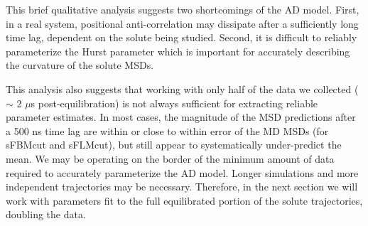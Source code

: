 \documentclass[12pt]{article}
\begin{document}
  This brief qualitative analysis suggests two shortcomings of the AD model. First, in
  a real system, positional anti-correlation may dissipate after a sufficiently long 
  time lag, dependent on the solute being studied. Second, it is difficult to reliably
  parameterize the Hurst parameter which is important for accurately describing the 
  curvature of the solute MSDs.
  
  This analysis also suggests that working with only half of the data we collected
  ($\sim$ 2 $\mu$s post-equilibration) is not always sufficient for extracting reliable
  parameter estimates. In most cases, the magnitude of the MSD predictions after a 
  500 ns time lag are within or close to within error of the MD MSDs (for sFBMcut and
  sFLMcut), but still appear to systematically under-predict the mean. We may be
  operating on the border of the minimum amount of data required to accurately 
  parameterize the AD model. Longer simulations and more independent trajectories may
  be necessary. Therefore, in the next section we will work with parameters fit to the
  full equilibrated portion of the solute trajectories, doubling the data.
  
  


 
\end{document}

